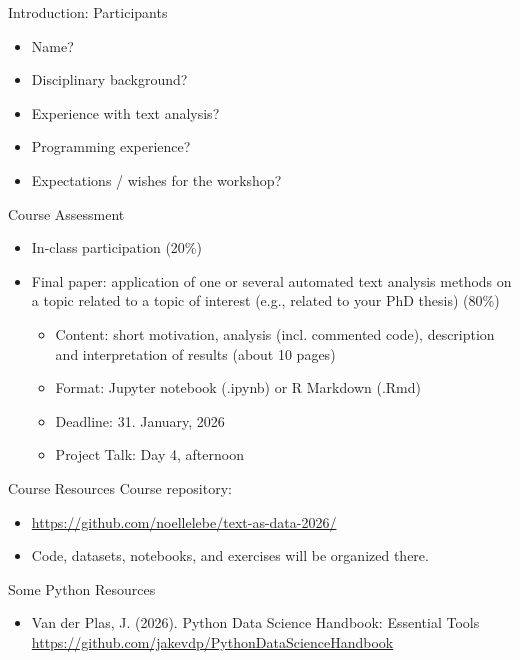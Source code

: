 \documentclass[11pt,aspectratio=43]{beamer}
\begin{document}
\begin{frame}{Introduction: Participants}
\begin{itemize}
\item Name?
\item Disciplinary background?
\item Experience with text analysis?
\item Programming experience?
\item Expectations / wishes for the workshop?
\end{itemize}
\end{frame}

\begin{frame}{Course Assessment}
\begin{itemize}
\item In-class participation (20\%)\\
\item Final paper: application of one or several automated text analysis methods on a topic related to a topic of interest (e.g., related to your PhD thesis) (80\%)
\begin{itemize}
\item Content: short motivation, analysis (incl. commented code), description and interpretation of results (about 10 pages)
\item Format: Jupyter notebook (.ipynb) or R Markdown (.Rmd)
\item Deadline: 31. January, 2026
\item Project Talk: Day 4, afternoon
\end{itemize}
\end{itemize}
\end{frame}

\begin{frame}{Course Resources}
Course repository:
\begin{itemize}
\item \url{https://github.com/noellelebe/text-as-data-2026/}
\item Code, datasets, notebooks, and exercises will be organized there.
\end{itemize}
\end{frame}

\begin{frame}{Some Python Resources}
\begin{itemize}
\item Van der Plas, J. (2026). Python Data Science Handbook: Essential Tools \url{https://github.com/jakevdp/PythonDataScienceHandbook}
\end{itemize}
\end{frame}
\end{document}
